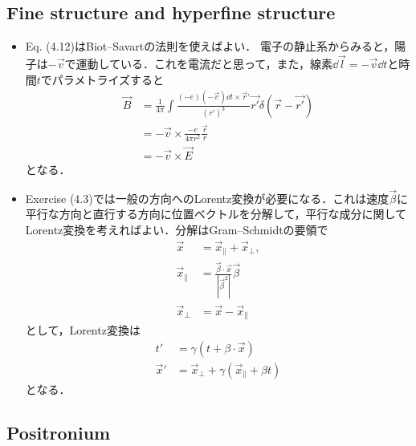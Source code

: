 \subsection{Fine structure and hyperfine structure}
\begin{itemize}
		\item Eq. (4.12)はBiot--Savartの法則を使えばよい．
				電子の静止系からみると，陽子は$-\vec{v} $で運動している．これを電流だと思って，また，線素$\dd{\vec{l}}=-\vec{v}\dd{t} $と時間$t $でパラメトライズすると
				\begin{align}
						\vec{B} &= \frac{1}{4\pi}\int\frac{(-e)(-\vec{v})\dd{t}\times\vec{r}'}{(r')^3}\vec{r'}\delta(\vec{r} - \vec{r'})\\
								&= -\vec{v}\times \frac{-e}{4\pi r^2}\frac{\vec{r}}{r}\\
								&= -\vec{v} \times \vec{E}
				\end{align}
				となる．
		\item Exercise (4.3)では一般の方向へのLorentz変換が必要になる．これは速度$\vec{\beta} $に平行な方向と直行する方向に位置ベクトルを分解して，平行な成分に関してLorentz変換を考えればよい．分解はGram--Schmidtの要領で
				\begin{align}
						\vec{x} &= \vec{x}_{\parallel}+\vec{x}_{\perp},\\
						\vec{x}_{\parallel} &= \frac{\vec{\beta}\cdot\vec{x}}{|\vec{\beta}^2|}\vec{\beta}\\
						\vec{x}_{\perp} &= \vec{x} - \vec{x}_{\parallel}
				\end{align}
				として，Lorentz変換は
				\begin{align}
						t' &= \gamma(t + \beta \cdot \vec{x})\\
						\vec{x}' &= \vec{x}_{\perp} + \gamma(\vec{x}_{\parallel} + \beta t)
				\end{align}
				となる．
\end{itemize}
\subsection{Positronium}
